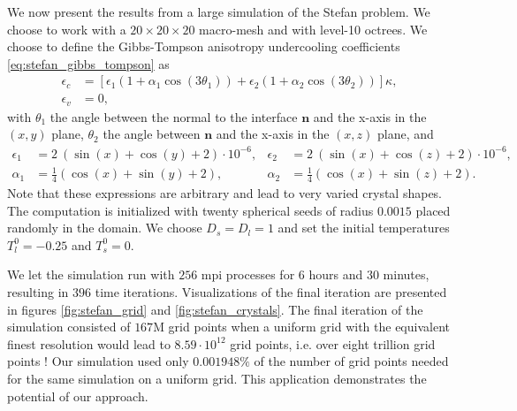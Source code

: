 We now present the results from a large simulation of the Stefan problem. We choose to work with a $20\times20\times20$ macro-mesh and with level-10 octrees. We choose to define the Gibbs-Tompson anisotropy undercooling coefficients \eqref{eq:stefan_gibbs_tompson} as
\begin{align*}
\epsilon_c & = \left[ \epsilon_1 \left( 1+\alpha_1 \cos(3\theta_1) \right) + \epsilon_2 \left( 1+\alpha_2 \cos(3\theta_2) \right) \right] \kappa,\\
\epsilon_v & = 0,
\end{align*}
with $\theta_1$ the angle between the normal to the interface $\mathbf{n}$ and the x-axis in the $(x,y)$ plane, $\theta_2$ the angle between $\mathbf{n}$ and the x-axis in the $(x,z)$ plane, and
\begin{align*}
\epsilon_1 & = 2~(\sin(x)+\cos(y)+2)\cdot10^{-6}, & \epsilon_2 & = 2~(\sin(x)+\cos(z)+2)\cdot10^{-6}, \\
\alpha_1 & = \frac{1}{4}(\cos(x)+\sin(y)+2), & \alpha_2 & = \frac{1}{4}(\cos(x)+\sin(z)+2).
\end{align*}
Note that these expressions are arbitrary and lead to very varied crystal shapes. The computation is initialized with twenty spherical seeds of radius $0.0015$ placed randomly in the domain. We choose $D_s=D_l=1$ and set the initial temperatures $T^0_l=-0.25$ and $T^0_s=0$.

We let the simulation run with $256$ mpi processes for $6$ hours and $30$ minutes, resulting in $396$ time iterations. Visualizations of the final iteration are presented in figures \ref{fig:stefan_grid} and \ref{fig:stefan_crystals}. The final iteration of the simulation consisted of $167$M grid points when a uniform grid with the equivalent finest resolution would lead to $8.59\cdot10^{12}$ grid points, i.e. over eight trillion grid points ! Our simulation used only $0.001948\%$ of the number of grid points needed for the same simulation on a uniform grid. This application demonstrates the potential of our approach.

